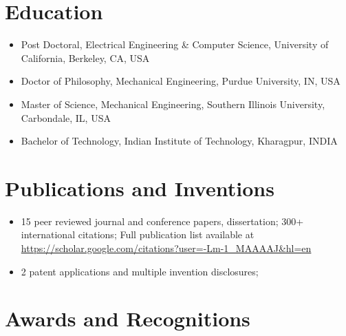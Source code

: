 \documentclass[letterpaper,11pt]{article}
\begin{document}
{\section{Education}}
\begin{itemize}%
 \setlength{\itemsep}{0pt}
 \item Post Doctoral, Electrical Engineering \& Computer Science, University of California, Berkeley, CA, USA
\item Doctor of Philosophy, Mechanical Engineering, Purdue University, IN, USA
\item Master of Science, Mechanical Engineering, Southern Illinois University, Carbondale, IL, USA
\item Bachelor of Technology, Indian Institute of Technology, Kharagpur, INDIA

\end{itemize}

    {\section{Publications and Inventions}}
    \begin{itemize}%
 \setlength{\itemsep}{0pt}
 \item 15 peer reviewed journal and conference papers, dissertation; 300+ international citations; Full publication list available at \url{https://scholar.google.com/citations?user=-Lm-1_MAAAAJ&hl=en}
 \item 2 patent applications and multiple invention disclosures; 
 
\end{itemize}


{\section{Awards and Recognitions}}
\end{document}
